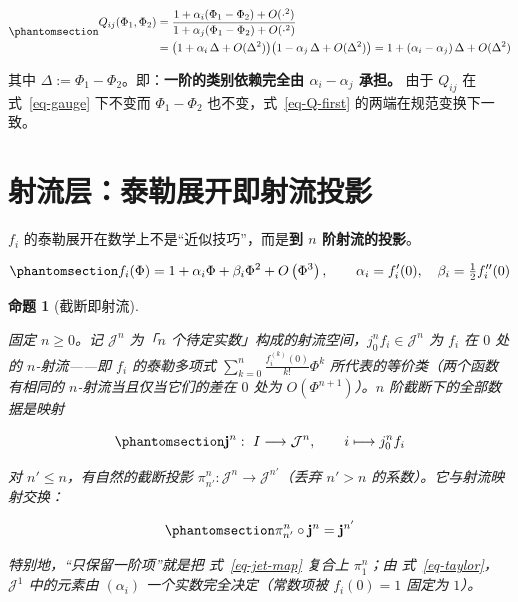 \documentclass[
  chinese,
  a4paper,
  UTF8,
  12pt,
  oneside,
  openany]{ctexbook}
\theoremstyle{plain}
\theoremstyle{plain}
\theoremstyle{plain}
\newtheorem{proposition}{命题}[chapter]
\theoremstyle{definition}
\theoremstyle{plain}
\theoremstyle{plain}
\theoremstyle{remark}
\begin{document}
\begin{equation}\protect\phantomsection\label{eq-Q-first}{
\begin{aligned}
Q_{ij}(\Phi_1,\Phi_2)
&=\frac{1+\alpha_i(\Phi_1-\Phi_2)+O(\cdot^{2})}{1+\alpha_j(\Phi_1-\Phi_2)+O(\cdot^{2})}\\
&=\bigl(1+\alpha_i\,\Delta+O(\Delta^{2})\bigr)\bigl(1-\alpha_j\,\Delta+O(\Delta^{2})\bigr)
=1+(\alpha_i-\alpha_j)\,\Delta+O(\Delta^{2})
\end{aligned}
}\end{equation}

其中 \(\Delta:=\Phi_1-\Phi_2\)。即：\textbf{一阶的类别依赖完全由
\(\alpha_i-\alpha_j\) 承担。} 由于 \(Q_{ij}\) 在 式~\ref{eq-gauge}
下不变而 \(\Phi_1-\Phi_2\) 也不变，式~\ref{eq-Q-first}
的两端在规范变换下一致。

\section{射流层：泰勒展开即射流投影}\label{sec-cc-jets}

\(f_i\) 的泰勒展开在数学上不是``近似技巧''，而是\textbf{到 \(n\)
阶射流的投影}。

\begin{equation}\protect\phantomsection\label{eq-taylor}{
f_i(\Phi) = 1 + \alpha_i\Phi + \beta_i\Phi^{2} + O\left(\Phi^{3}\right),
\qquad
\alpha_i = f_i'(0),\quad \beta_i = \tfrac{1}{2}f_i''(0)
}\end{equation}

\begin{proposition}[截断即射流]\protect\hypertarget{prp-truncation}{}\label{prp-truncation}

固定 \(n\ge0\)。记 \(\mathcal{J}^{n}\) 为「\(n\)
个待定实数」构成的射流空间，\(j^{n}_{0}f_i\in\mathcal{J}^{n}\) 为
\(f_i\) 在 \(0\) 处的 \(n\)-射流------即 \(f_i\) 的泰勒多项式
\(\sum_{k=0}^{n}\frac{f_i^{(k)}(0)}{k!}\Phi^{k}\)
所代表的等价类（两个函数有相同的 \(n\)-射流当且仅当它们的差在 \(0\) 处为
\(O(\Phi^{n+1})\)）。\(n\) 阶截断下的全部数据是映射

\begin{equation}\protect\phantomsection\label{eq-jet-map}{
\mathbf{j}^{n}:\ I \longrightarrow \mathcal{J}^{n},
\qquad
i \longmapsto j^{n}_{0}f_i
}\end{equation}

对 \(n'\le n\)，有自然的截断投影
\(\pi^{n}_{n'}:\mathcal{J}^{n}\to\mathcal{J}^{n'}\)（丢弃 \(n'>n\)
的系数）。它与射流映射交换：

\begin{equation}\protect\phantomsection\label{eq-jet-project}{
\pi^{n}_{n'}\circ\mathbf{j}^{n}=\mathbf{j}^{n'}
}\end{equation}

特别地，``只保留一阶项''就是把 式~\ref{eq-jet-map} 复合上
\(\pi^{n}_{1}\)；由 式~\ref{eq-taylor}，\(\mathcal{J}^{1}\) 中的元素由
\((\alpha_i)\) 一个实数完全决定（常数项被 \(f_i(0)=1\) 固定为 \(1\)）。

\end{proposition}
\end{document}
